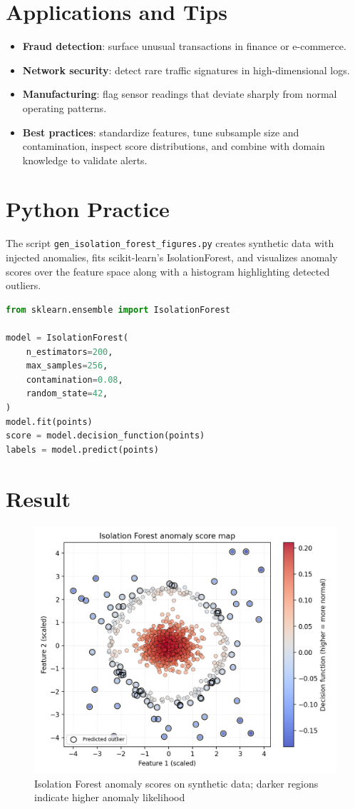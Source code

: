 ﻿\documentclass[12pt]{article}
\begin{document}
\section{Applications and Tips}
\begin{itemize}
  \item \textbf{Fraud detection}: surface unusual transactions in finance or e-commerce.
  \item \textbf{Network security}: detect rare traffic signatures in high-dimensional logs.
  \item \textbf{Manufacturing}: flag sensor readings that deviate sharply from normal operating patterns.
  \item \textbf{Best practices}: standardize features, tune subsample size and contamination, inspect score distributions, and combine with domain knowledge to validate alerts.
\end{itemize}

\section{Python Practice}
The script \texttt{gen\_isolation\_forest\_figures.py} creates synthetic data with injected anomalies, fits scikit-learn's IsolationForest, and visualizes anomaly scores over the feature space along with a histogram highlighting detected outliers.
\begin{lstlisting}[language=Python,caption={Excerpt from gen_isolation_forest_figures.py}]
from sklearn.ensemble import IsolationForest

model = IsolationForest(
    n_estimators=200,
    max_samples=256,
    contamination=0.08,
    random_state=42,
)
model.fit(points)
score = model.decision_function(points)
labels = model.predict(points)
\end{lstlisting}

\section{Result}
\begin{figure}[H]
  \centering
  \includegraphics[width=0.82\linewidth]{isolation_forest_decision.png}
  \caption{Isolation Forest anomaly scores on synthetic data; darker regions indicate higher anomaly likelihood}
  \label{fig:isolation_forest_decision}
\end{figure}
\end{document}
